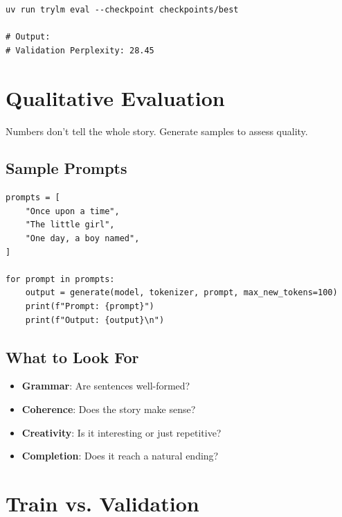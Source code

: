 \begin{lstlisting}[style=shell]
uv run trylm eval --checkpoint checkpoints/best

# Output:
# Validation Perplexity: 28.45
\end{lstlisting}

\section{Qualitative Evaluation}

Numbers don't tell the whole story. Generate samples to assess quality.

\subsection{Sample Prompts}

\begin{lstlisting}[style=python]
prompts = [
    "Once upon a time",
    "The little girl",
    "One day, a boy named",
]

for prompt in prompts:
    output = generate(model, tokenizer, prompt, max_new_tokens=100)
    print(f"Prompt: {prompt}")
    print(f"Output: {output}\n")
\end{lstlisting}

\subsection{What to Look For}

\begin{itemize}
    \item \textbf{Grammar}: Are sentences well-formed?
    \item \textbf{Coherence}: Does the story make sense?
    \item \textbf{Creativity}: Is it interesting or just repetitive?
    \item \textbf{Completion}: Does it reach a natural ending?
\end{itemize}

\section{Train vs. Validation}

